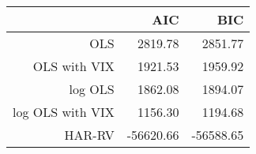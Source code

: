 \begin{table}[ht]
\centering
\begin{tabular}{rrr}
  \hline
 & AIC & BIC \\ 
  \hline
OLS & 2819.78 & 2851.77 \\ 
  OLS with VIX & 1921.53 & 1959.92 \\ 
  log OLS & 1862.08 & 1894.07 \\ 
  log OLS with VIX & 1156.30 & 1194.68 \\ 
  HAR-RV & -56620.66 & -56588.65 \\ 
   \hline
\end{tabular}
\end{table}
